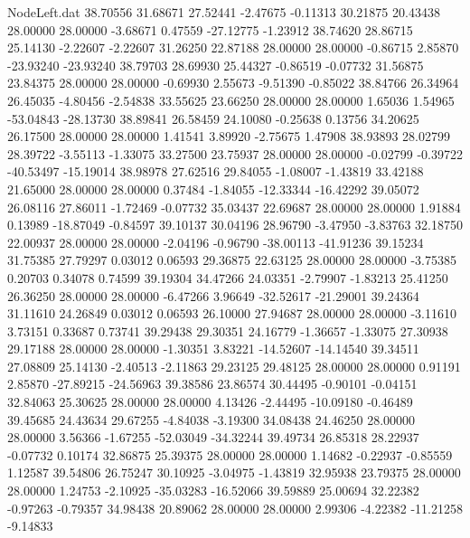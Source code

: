\begin{filecontents}{NodeLeft.dat}
  38.70556   31.68671   27.52441    -2.47675   -0.11313   30.21875   20.43438   28.00000   28.00000   -3.68671    0.47559  -27.12775   -1.23912
  38.74620   28.86715   25.14130    -2.22607   -2.22607   31.26250   22.87188   28.00000   28.00000   -0.86715    2.85870  -23.93240  -23.93240
  38.79703   28.69930   25.44327    -0.86519   -0.07732   31.56875   23.84375   28.00000   28.00000   -0.69930    2.55673   -9.51390   -0.85022
  38.84766   26.34964   26.45035    -4.80456   -2.54838   33.55625   23.66250   28.00000   28.00000    1.65036    1.54965  -53.04843  -28.13730
  38.89841   26.58459   24.10080    -0.25638    0.13756   34.20625   26.17500   28.00000   28.00000    1.41541    3.89920   -2.75675    1.47908
  38.93893   28.02799   28.39722    -3.55113   -1.33075   33.27500   23.75937   28.00000   28.00000   -0.02799   -0.39722  -40.53497  -15.19014
  38.98978   27.62516   29.84055    -1.08007   -1.43819   33.42188   21.65000   28.00000   28.00000    0.37484   -1.84055  -12.33344  -16.42292
  39.05072   26.08116   27.86011    -1.72469   -0.07732   35.03437   22.69687   28.00000   28.00000    1.91884    0.13989  -18.87049   -0.84597
  39.10137   30.04196   28.96790    -3.47950   -3.83763   32.18750   22.00937   28.00000   28.00000   -2.04196   -0.96790  -38.00113  -41.91236
  39.15234   31.75385   27.79297     0.03012    0.06593   29.36875   22.63125   28.00000   28.00000   -3.75385    0.20703    0.34078    0.74599
  39.19304   34.47266   24.03351    -2.79907   -1.83213   25.41250   26.36250   28.00000   28.00000   -6.47266    3.96649  -32.52617  -21.29001
  39.24364   31.11610   24.26849     0.03012    0.06593   26.10000   27.94687   28.00000   28.00000   -3.11610    3.73151    0.33687    0.73741
  39.29438   29.30351   24.16779    -1.36657   -1.33075   27.30938   29.17188   28.00000   28.00000   -1.30351    3.83221  -14.52607  -14.14540
  39.34511   27.08809   25.14130    -2.40513   -2.11863   29.23125   29.48125   28.00000   28.00000    0.91191    2.85870  -27.89215  -24.56963
  39.38586   23.86574   30.44495    -0.90101   -0.04151   32.84063   25.30625   28.00000   28.00000    4.13426   -2.44495  -10.09180   -0.46489
  39.45685   24.43634   29.67255    -4.84038   -3.19300   34.08438   24.46250   28.00000   28.00000    3.56366   -1.67255  -52.03049  -34.32244
  39.49734   26.85318   28.22937    -0.07732    0.10174   32.86875   25.39375   28.00000   28.00000    1.14682   -0.22937   -0.85559    1.12587
  39.54806   26.75247   30.10925    -3.04975   -1.43819   32.95938   23.79375   28.00000   28.00000    1.24753   -2.10925  -35.03283  -16.52066
  39.59889   25.00694   32.22382    -0.97263   -0.79357   34.98438   20.89062   28.00000   28.00000    2.99306   -4.22382  -11.21258   -9.14833

\end{filecontents}
